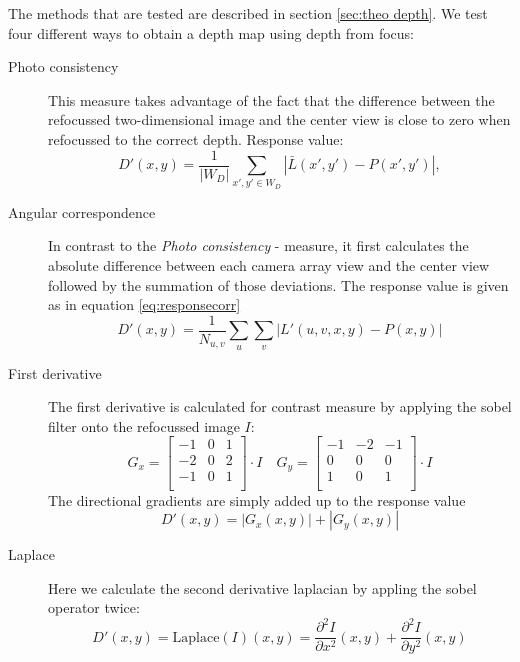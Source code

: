 \documentclass  [
  paper    = a4,
  BCOR     = 10mm,
  twoside,
  fontsize = 12pt,
  fleqn,
  toc      = bibnumbered,
  toc      = listofnumbered,
  numbers  = noendperiod,
  headings = normal,
  listof   = leveldown,
  version  = 3.03
]                                       {scrreprt}
\begin{document}
The methods that are tested are described in section \ref{sec:theo depth}. We test four different ways to obtain a depth map using depth from focus:
\begin{description}
	\item[Photo consistency] This measure takes advantage of the fact that the difference between the refocussed two-dimensional image and the center view is close to zero when refocussed to  the correct depth. Response value:
	\begin{equation}\label{key}
	D'(x,y) = \frac{1}{|W_D|}\sum_{x',y' \in W_D} \left|\bar{L}(x',y')- P(x', y')\right|,
	\end{equation}
	\item[Angular correspondence] In contrast to the \textit{Photo consistency} - measure, it first calculates the absolute difference between each camera array view and the center view followed by the summation of those deviations. The response value is given as in equation \eqref{eq:responsecorr}
	\begin{equation}\label{key}
	D'(x,y) = \frac{1}{N_{u,v}}\sum_{u}\sum_{v}  \left|L'(u, v, x, y) - P(x,y)\right|
	\end{equation}
	
	\item[First derivative] The first derivative is calculated for contrast measure by applying the sobel filter onto the refocussed image $I$:
	\begin{equation}\label{key}
	 G_x=
	 \left[ {\begin{array}{ccc}
	 	-1 & 0 & 1 \\
	 	-2 & 0 & 2 \\
	 	-1 & 0 & 1 \\
	 	\end{array} } \right] \cdot I \quad G_y=
	 \left[ {\begin{array}{ccc}
	 	-1 &-2 &-1 \\
	 	0 & 0 & 0 \\
	 	1 & 0 & 1 \\
	 	\end{array} } \right] \cdot I
	\end{equation} 
	The directional gradients are simply added up to the response value
	\begin{equation}\label{key}
	D'(x,y) = |G_x(x,y)| + |G_y(x,y)|
	\end{equation}
	\item[Laplace] Here we calculate the second derivative laplacian by appling the sobel operator twice:\begin{equation}\label{key}
	D'(x,y) = \text{Laplace}(I)(x,y) = \frac{\partial^2 I}{\partial x^2}(x,y) + \frac{\partial^2 I}{\partial y^2}(x,y)
	\end{equation}
	

\end{description}
\end{document}
